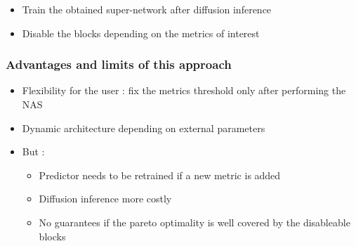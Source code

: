\documentclass[aspectratio=169,xcolor=dvipsnames]{beamer}
\begin{document}
\begin{frame}
    \begin{itemize}
        \item Train the obtained super-network after diffusion inference
        \item Disable the blocks depending on the metrics of interest
    \end{itemize}
\end{frame}


\begin{frame}
    \frametitle{Advantages and limits of this approach}
    \begin{itemize}
        \item Flexibility for the user : fix the metrics threshold only after performing the NAS
        \item Dynamic architecture depending on external parameters
        \item But :
        \begin{itemize}
            \item Predictor needs to be retrained if a new metric is added
            \item Diffusion inference more costly
            \item No guarantees if the pareto optimality is well covered by the disableable blocks
        \end{itemize}
    \end{itemize}
\end{frame}
\end{document}

